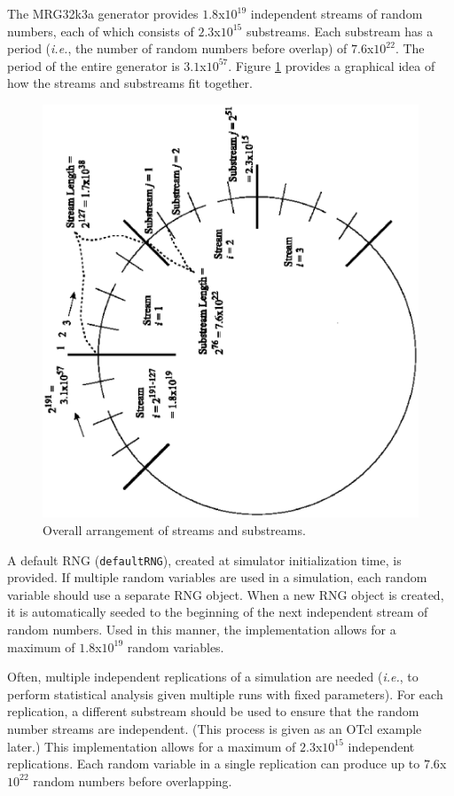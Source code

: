 The MRG32k3a generator provides $1.8$x$10^{19}$ independent
streams of random numbers, each of which consists of
$2.3$x$10^{15}$ substreams. Each substream has a period
(\emph{i.e.}, the number of random numbers before overlap) of
$7.6$x$10^{22}$. The period of the entire generator is
$3.1$x$10^{57}$. Figure \ref{streams} provides a graphical idea of
how the streams and substreams fit together.
\begin{figure}[ht]
\centering
\includegraphics[angle=270,width=6 in]{rng-streams.eps}
\caption{Overall arrangement of streams and substreams.
\cite{lecuyer01}} \label{streams}
\end{figure}

A default RNG ({\tt defaultRNG}), created at simulator initialization
time, is provided. If multiple random variables are used in a
simulation, each random variable should use a separate RNG object.
When a new RNG object is created, it is automatically seeded to
the beginning of the next independent stream of random numbers.
Used in this manner, the implementation allows for a maximum of
$1.8$x$10^{19}$ random variables.

Often, multiple independent replications of a simulation are
needed (\emph{i.e.}, to perform statistical analysis given
multiple runs with fixed parameters).  For each replication, a
different substream should be used to ensure that the random
number streams are independent. (This process is given as an OTcl
example later.) This implementation allows for a maximum of
$2.3$x$10^{15}$ independent replications. Each random variable in
a single replication can produce up to $7.6$x$10^{22}$ random
numbers before overlapping.

